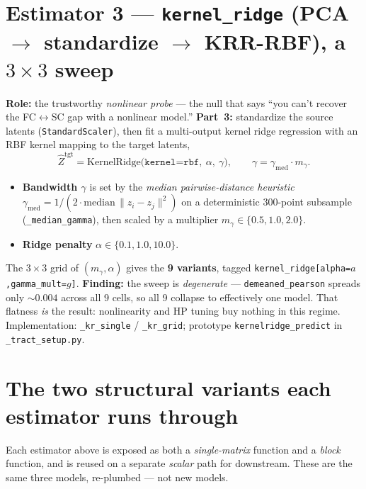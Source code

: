 \documentclass[11pt]{article}
\newcommand{\code}[1]{\texttt{#1}}
\begin{document}
\section{Estimator 3 --- \code{kernel\_ridge} (PCA $\to$ standardize $\to$ KRR-RBF), a $3\times3$ sweep}\label{sec:kr}

\textbf{Role:} the trustworthy \emph{nonlinear probe} --- the null that says ``you can't recover
the FC$\leftrightarrow$SC gap with a nonlinear model.'' \textbf{Part~3:} standardize the source
latents (\texttt{StandardScaler}), then fit a multi-output kernel ridge regression with an RBF
kernel mapping to the target latents,
\[
  \hat Z^{\mathrm{tgt}} = \mathrm{KernelRidge}\big(\texttt{kernel=rbf},\ \alpha,\ \gamma\big),
  \qquad \gamma = \gamma_{\mathrm{med}}\cdot m_\gamma .
\]
\begin{itemize}[leftmargin=1.4em]
\item \textbf{Bandwidth $\gamma$} is set by the \emph{median pairwise-distance heuristic}
  $\gamma_{\mathrm{med}} = 1/(2\cdot\mathrm{median}\,\lVert z_i - z_j\rVert^2)$ on a deterministic
  300-point subsample (\code{\_median\_gamma}), then scaled by a multiplier
  $m_\gamma \in \{0.5, 1.0, 2.0\}$.
\item \textbf{Ridge penalty} $\alpha \in \{0.1, 1.0, 10.0\}$.
\end{itemize}
The $3\times3$ grid of $(m_\gamma,\alpha)$ gives the \textbf{9 variants}, tagged
\code{kernel\_ridge[alpha=$a$,gamma\_mult=$g$]}. \textbf{Finding:} the sweep is \emph{degenerate}
--- \code{demeaned\_pearson} spreads only $\sim0.004$ across all 9 cells, so all 9 collapse to
effectively one model. That flatness \emph{is} the result: nonlinearity and HP tuning buy nothing
in this regime. Implementation: \code{\_kr\_single} / \code{\_kr\_grid}; prototype
\code{kernelridge\_predict} in \code{\_tract\_setup.py}.

\section{The two structural variants each estimator runs through}\label{sec:variants}

Each estimator above is exposed as both a \emph{single-matrix} function and a \emph{block}
function, and is reused on a separate \emph{scalar} path for downstream. These are the same three
models, re-plumbed --- not new models.
\end{document}
